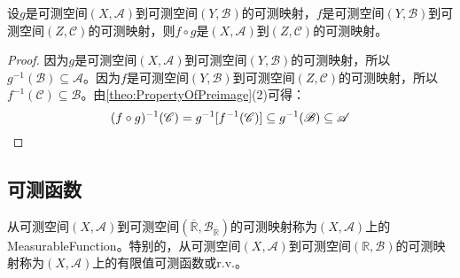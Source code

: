 \begin{theorem}
	设$g$是可测空间$(X,\mathscr{A})$到可测空间$(Y,\mathscr{B})$的可测映射，$f$是可测空间$(Y,\mathscr{B})$到可测空间$(Z,\mathscr{C})$的可测映射，则$f\circ g$是$(X,\mathscr{A})$到$(Z,\mathscr{C})$的可测映射。
\end{theorem}
\begin{proof}
	因为$g$是可测空间$(X,\mathscr{A})$到可测空间$(Y,\mathscr{B})$的可测映射，所以$g^{-1}(\mathscr{B})\subseteq\mathscr{A}$。因为$f$是可测空间$(Y,\mathscr{B})$到可测空间$(Z,\mathscr{C})$的可测映射，所以$f^{-1}(\mathscr{C})\subseteq\mathscr{B}$。由\cref{theo:PropertyOfPreimage}(2)可得：
	\begin{equation*}
		(f\circ g)^{-1}(\mathscr{C})=g^{-1}[f^{-1}(\mathscr{C})]\subseteq g^{-1}(\mathscr{B})\subseteq\mathscr{A}\qedhere
	\end{equation*}
\end{proof}

\subsection{可测函数}
\begin{definition}
	从可测空间$(X,\mathscr{A})$到可测空间$(\overline{\mathbb{R}},\mathcal{B}_{\overline{\mathbb{R}}})$的可测映射称为$(X,\mathscr{A})$上的\gls{MeasurableFunction}。特别的，从可测空间$(X,\mathscr{A})$到可测空间$(\mathbb{R},\mathcal{B})$的可测映射称为$(X,\mathscr{A})$上的有限值可测函数或\gls{r.v.}。
\end{definition}
